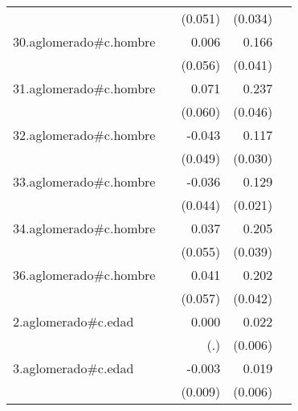 {\begin{longtable}{l*{4}{D{.}{.}{-1}}}
            &                     &     (0.051)         &     (0.034)         &                     \\
\addlinespace
30.aglomerado#c.hombre&                     &       0.006         &       0.166\sym{***}&                     \\
            &                     &     (0.056)         &     (0.041)         &                     \\
\addlinespace
31.aglomerado#c.hombre&                     &       0.071         &       0.237\sym{***}&                     \\
            &                     &     (0.060)         &     (0.046)         &                     \\
\addlinespace
32.aglomerado#c.hombre&                     &      -0.043         &       0.117\sym{***}&                     \\
            &                     &     (0.049)         &     (0.030)         &                     \\
\addlinespace
33.aglomerado#c.hombre&                     &      -0.036         &       0.129\sym{***}&                     \\
            &                     &     (0.044)         &     (0.021)         &                     \\
\addlinespace
34.aglomerado#c.hombre&                     &       0.037         &       0.205\sym{***}&                     \\
            &                     &     (0.055)         &     (0.039)         &                     \\
\addlinespace
36.aglomerado#c.hombre&                     &       0.041         &       0.202\sym{***}&                     \\
            &                     &     (0.057)         &     (0.042)         &                     \\
\addlinespace
2.aglomerado#c.edad&                     &       0.000         &       0.022\sym{***}&                     \\
            &                     &         (.)         &     (0.006)         &                     \\
\addlinespace
3.aglomerado#c.edad&                     &      -0.003         &       0.019\sym{***}&                     \\
            &                     &     (0.009)         &     (0.006)         &                     \\

\end{longtable}}
